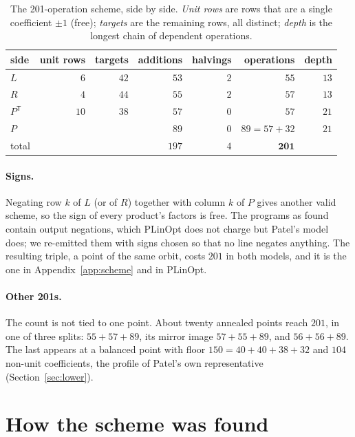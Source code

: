 \documentclass[11pt]{article}
\theoremstyle{remark}
\newcommand{\Pt}{P^{\mathsf T}}
\begin{document}
\begin{table}[ht]
\centering
\caption{The 201-operation scheme, side by side.  \emph{Unit rows} are
rows that are a single coefficient $\pm1$ (free); \emph{targets} are the
remaining rows, all distinct; \emph{depth} is the longest chain of
dependent operations.}\label{tab:sides}
\begin{tabular}{lrrrrrr}
\toprule
side & unit rows & targets & additions & halvings & operations & depth \\
\midrule
$L$ & $6$ & $42$ & $53$ & $2$ & $55$ & $13$ \\
$R$ & $4$ & $44$ & $55$ & $2$ & $57$ & $13$ \\
$\Pt$ & $10$ & $38$ & $57$ & $0$ & $57$ & $21$ \\
$P$ & & & $89$ & $0$ & $89=57+32$ & $21$ \\
\midrule
total & & & $197$ & $4$ & $\mathbf{201}$ & \\
\bottomrule
\end{tabular}
\end{table}

\paragraph{Signs.}  Negating row $k$ of $L$ (or of $R$) together with
column $k$ of $P$ gives another valid scheme, so the sign of every
product's factors is free.  The programs as found contain output
negations, which PLinOpt does not charge but Patel's model does; we
re-emitted them with signs chosen so that no line negates anything.
The resulting triple, a point of the same orbit, costs $201$ in both
models, and it is the one in Appendix~\ref{app:scheme} and in PLinOpt.

\paragraph{Other 201s.}  The count is not tied to one point.  About
twenty annealed points reach $201$, in one of three splits:
$55+57+89$, its mirror image $57+55+89$, and $56+56+89$.  The last
appears at a balanced point with floor $150=40+40+38+32$ and $104$
non-unit coefficients, the profile of Patel's own representative
(Section~\ref{sec:lower}).

\section{How the scheme was found}\label{sec:found}
\end{document}
